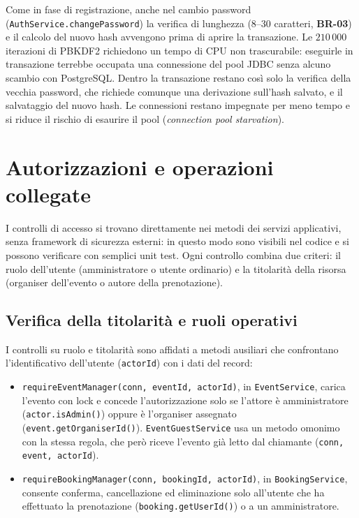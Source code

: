 Come in fase di registrazione, anche nel cambio password (\texttt{AuthService.changePassword}) la verifica di lunghezza (8--30 caratteri, \textbf{BR-03}) e il calcolo del nuovo hash avvengono prima di aprire la transazione. Le $210\,000$ iterazioni di PBKDF2 richiedono un tempo di CPU non trascurabile: eseguirle in transazione terrebbe occupata una connessione del pool JDBC senza alcuno scambio con PostgreSQL. Dentro la transazione restano così solo la verifica della vecchia password, che richiede comunque una derivazione sull'hash salvato, e il salvataggio del nuovo hash. Le connessioni restano impegnate per meno tempo e si riduce il rischio di esaurire il pool (\textit{connection pool starvation}).

\section{Autorizzazioni e operazioni collegate}
\label{sec:autorizzazioni-operazioni}

I controlli di accesso si trovano direttamente nei metodi dei servizi applicativi, senza framework di sicurezza esterni: in questo modo sono visibili nel codice e si possono verificare con semplici unit test. Ogni controllo combina due criteri: il ruolo dell'utente (amministratore o utente ordinario) e la titolarità della risorsa (organiser dell'evento o autore della prenotazione).

\subsection{Verifica della titolarità e ruoli operativi}
\label{sec:titolarita-ruoli}

I controlli su ruolo e titolarità sono affidati a metodi ausiliari che confrontano l'identificativo dell'utente (\texttt{actorId}) con i dati del record:

\begin{itemize}
    \item \texttt{requireEventManager(\allowbreak{}conn,\allowbreak{} eventId,\allowbreak{} actorId)}, in \texttt{EventService}, carica l'evento con lock e concede l'autorizzazione solo se l'attore è amministratore (\texttt{actor.isAdmin()}) oppure è l'organiser assegnato (\texttt{event.getOrganiserId()}). \texttt{EventGuestService} usa un metodo omonimo con la stessa regola, che però riceve l'evento già letto dal chiamante (\texttt{conn, event, actorId}).
    \item \texttt{requireBookingManager(conn, bookingId, actorId)}, in \texttt{BookingService}, consente conferma, cancellazione ed eliminazione solo all'utente che ha effettuato la prenotazione (\texttt{booking.getUserId()}) o a un amministratore.
\end{itemize}

